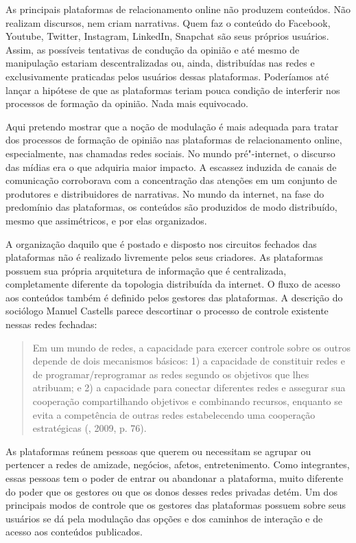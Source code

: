 As principais plataformas de relacionamento online não produzem
conteúdos. Não realizam discursos, nem criam narrativas. Quem faz o
conteúdo do Facebook, Youtube, Twitter, Instagram, LinkedIn, Snapchat
são seus próprios usuários. Assim, as possíveis tentativas de condução
da opinião e até mesmo de manipulação estariam descentralizadas ou,
ainda, distribuídas nas redes e exclusivamente praticadas pelos usuários
dessas plataformas. Poderíamos até lançar a hipótese de que as
plataformas teriam pouca condição de interferir nos processos de
formação da opinião. Nada mais equivocado.

Aqui pretendo mostrar que a noção de modulação é mais adequada para
tratar dos processos de formação de opinião nas plataformas de
relacionamento online, especialmente, nas chamadas redes sociais. No
mundo pré"-internet, o discurso das mídias era o que adquiria maior
impacto. A escassez induzida de canais de comunicação corroborava com a
concentração das atenções em um conjunto de produtores e distribuidores
de narrativas. No mundo da internet, na fase do predomínio das
plataformas, os conteúdos são produzidos de modo distribuído, mesmo que
assimétricos, e por elas organizados.

A organização daquilo que é postado e disposto nos circuitos fechados
das plataformas não é realizado livremente pelos seus criadores. As
plataformas possuem sua própria arquitetura de informação que é
centralizada, completamente diferente da topologia distribuída da
internet. O fluxo de acesso aos conteúdos também é definido pelos
gestores das plataformas. A descrição do sociólogo Manuel Castells
parece descortinar o processo de controle existente nessas redes
fechadas:

\begin{quote}
Em um mundo de redes, a capacidade para exercer controle sobre os outros
depende de dois mecanismos básicos: 1) a capacidade de constituir redes
e de programar/reprogramar as redes segundo os objetivos que lhes
atribuam; e 2) a capacidade para conectar diferentes redes e assegurar
sua cooperação compartilhando objetivos e combinando recursos, enquanto
se evita a competência de outras redes estabelecendo uma cooperação
estratégicas (, 2009, p. 76).
\end{quote}

As plataformas reúnem pessoas que querem ou necessitam se agrupar ou
pertencer a redes de amizade, negócios, afetos, entretenimento. Como
integrantes, essas pessoas tem o poder de entrar ou abandonar a
plataforma, muito diferente do poder que os gestores ou que os donos
desses redes privadas detém. Um dos principais modos de controle que os
gestores das plataformas possuem sobre seus usuários se dá pela
modulação das opções e dos caminhos de interação e de acesso aos
conteúdos publicados.

